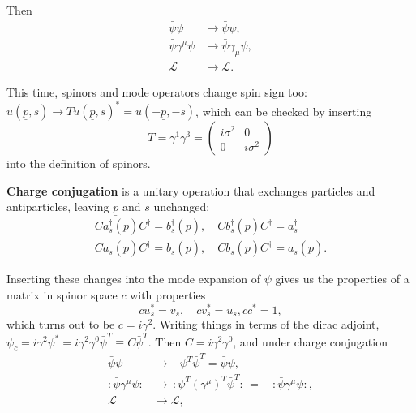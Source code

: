 \documentclass{article}
\numberwithin{equation}{section}
\newcommand{\normord}[1]{:\mathrel{#1}:}
\begin{document}
Then
\begin{equation}
\begin{aligned}
    \bar{\psi}\psi &\rightarrow \bar{\psi}\psi, \\
    \bar{\psi}\gamma^\mu \psi &\rightarrow \bar{\psi} \gamma_\mu \psi, \\
    \mathcal{L} & \rightarrow \mathcal{L}.
\end{aligned}
\end{equation}

This time, spinors and mode operators change spin sign too: $u(\underline{p}, s) \rightarrow T u(\underline{p}, s)^* = u(-\underline{p}, -s)$, which can be checked by inserting
\begin{equation}
    T=\gamma^1 \gamma^3=\left(\begin{array}{rr}
        i \sigma^2 & 0 \\
        0 & i \sigma^2
        \end{array}\right)
\end{equation}
into the definition of spinors.

\textbf{Charge conjugation} is a unitary operation that exchanges particles and antiparticles, leaving $\underline{p}$ and $s$ unchanged:
\begin{gather}
    Ca_s^\dagger(\underline{p})C^\dagger = b_s^\dagger(\underline{p}), \quad Cb_s^\dagger(\underline{p})C^\dagger = a_s^\dagger \\
    Ca_s(\underline{p})C^\dagger = b_s(\underline{p}), \quad Cb_s(\underline{p})C^\dagger = a_s(\underline{p}).
\end{gather}

Inserting these changes into the mode expansion of $\psi$ gives us the properties of a matrix in spinor space $c$ with properties 
\begin{equation}
    cu_s^* = v_s, \quad cv_s^* = u_s, cc^* = 1,
\end{equation}
which turns out to be $c=i\gamma^2$. Writing things in terms of the dirac adjoint, $\psi_c =i\gamma^2\psi^* = i\gamma^2\gamma^0 \bar{\psi}^T \equiv C\bar{\psi}^T$. Then $C = i\gamma^2\gamma^0$, and under charge conjugation
\begin{equation}
\begin{aligned}
    \bar{\psi}\psi &\rightarrow -\psi^T\bar{\psi}^T = \bar{\psi}\psi,\\
    \normord{\bar{\psi}\gamma^\mu\psi} &\rightarrow\, \normord{\psi^T(\gamma^\mu)^T\bar{\psi}^T}\, = \,-\normord{\bar{\psi}\gamma^\mu\psi}, \\
    \mathcal{L} &\rightarrow \mathcal{L},
\end{aligned}
\end{equation}
\end{document}
